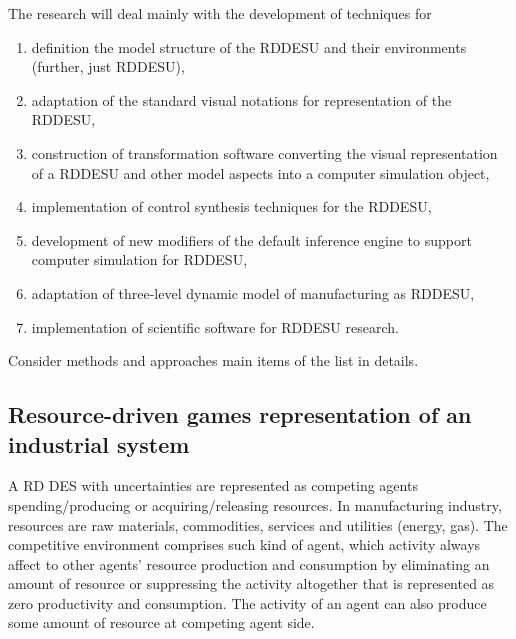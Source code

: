 \documentclass[conference,a4paper]{IEEEtran}
\begin{document}

The research will deal mainly with the development of techniques for
\begin{enumerate}
\item definition the model structure of the RDDESU and their environments (further, just RDDESU),
\item adaptation of the standard visual notations for representation of the RDDESU,
\item construction of transformation software converting the visual representation of a RDDESU and other model aspects into a computer simulation object,
\item implementation of control synthesis techniques for the RDDESU,
\item development of new modifiers of the default inference engine to support computer simulation for RDDESU,
\item adaptation of three-level dynamic model of manufacturing as RDDESU,
\item implementation of scientific software for RDDESU research.
\end{enumerate}

Consider methods and approaches main items of the list in details.

\subsection{Resource-driven games representation of an industrial system}
\label{sec:sub-rbg}

A RD DES with uncertainties are represented as competing agents spending/producing or acquiring/releasing resources. In manufacturing industry, resources are raw materials, commodities, services and utilities (energy, gas). The competitive environment comprises such kind of agent, which activity always affect to other agents' resource production and consumption by eliminating an amount of resource or suppressing the activity altogether that is represented as zero productivity and consumption. The activity of an agent can also produce some amount of resource at competing agent side.
\end{document}
